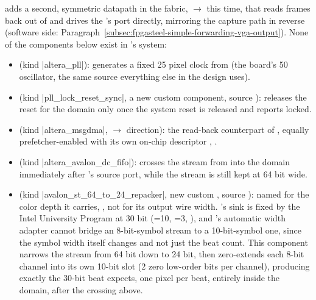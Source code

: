  adds a second, symmetric datapath in the  fabric, $\rightarrow$ this time, that reads frames back out of  and drives the 's  port directly, mirroring the capture path in reverse (software side: Paragraph~\ref{subsec:fpgasteel-simple-forwarding-vga-output}). None of the components below exist in  's system:

\begin{itemize}
    \item \textbf{} (kind |altera_pll|): generates a fixed 25  pixel clock from  (the board's 50  oscillator, the same  source everything else in the design uses).
    \item \textbf{} (kind |pll_lock_reset_sync|, a new custom component, source ): releases the reset for the  domain only once the system reset is released and  reports locked.
    \item \textbf{} (kind |altera_msgdma|, $\rightarrow$ direction): the read-back counterpart of , equally prefetcher-enabled with its own on-chip descriptor , .
    \item \textbf{} (kind |altera_avalon_dc_fifo|): crosses the stream from  into the  domain immediately after 's  source port, while the stream is still kept at 64 bit wide.
    \item \textbf{} (kind |avalon_st_64_to_24_repacker|, new custom , source ): named for the color depth it carries, , not for its output wire width. 's  sink is fixed by the Intel University Program  at 30 bit (=10, =3, ), and 's automatic width adapter cannot bridge an 8-bit-symbol stream to a 10-bit-symbol one, since the symbol width itself changes and not just the beat count. This component narrows the stream from 64 bit down to 24 bit, then zero-extends each 8-bit  channel into its own 10-bit slot (2 zero low-order bits per channel), producing exactly the 30-bit  beat  expects, one pixel per beat, entirely inside the  domain, after the crossing above.

\end{itemize}
